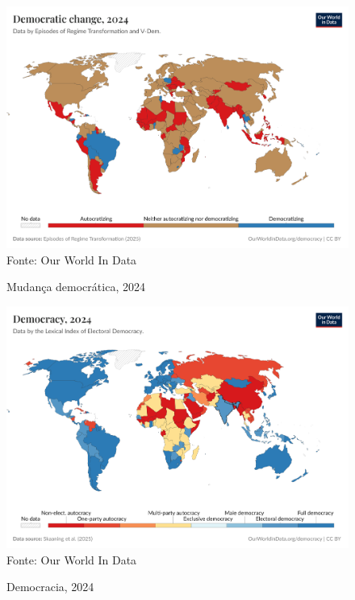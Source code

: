 \begin{figure}[ht]
    \centering
    \caption{Mudança democrática, 2024}
    \includegraphics[width=1\linewidth]{figuras/democracia/political-regime-ert.png}
    \label{fig:political-regime-ert}
    \footnotesize{Fonte: Our World In Data}
\end{figure}

\begin{figure}[ht]
    \centering
    \caption{Democracia, 2024}
    \includegraphics[width=1\linewidth]{figuras/democracia/political-regime-lexical.png}
    \label{fig:political-regime-lexical}
    \footnotesize{Fonte: Our World In Data}
\end{figure}
